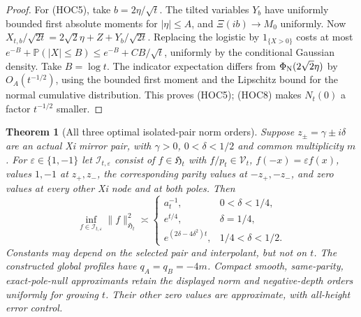 \documentclass[11pt]{article}
\newtheorem{theorem}{Theorem}
\theoremstyle{remark}\newtheorem{remark}[theorem]{Remark}
\begin{document}
\begin{proof}
For (HOC5), take $b=2\eta/\sqrt t$. The tilted variables $Y_b$
have uniformly bounded first absolute moments for $|\eta|\le A$,
and $\Xi(ib)\to M_0$ uniformly. Now
$X_{t,b}/\sqrt{2t}=2\sqrt2\eta+Z+Y_b/\sqrt{2t}$.
Replacing the logistic by $1_{\{X>0\}}$ costs at most
$e^{-B}+\mathbb P(|X|\le B)\le e^{-B}+CB/\sqrt t$,
uniformly by the conditional Gaussian density. Take $B=\log t$.
The indicator expectation differs from $\Phi_{\rm N}(2\sqrt2\eta)$
by $O_A(t^{-1/2})$, using the bounded first moment and the
Lipschitz bound for the normal cumulative distribution.
This proves (HOC5); (HOC8) makes $N_t(0)$ a factor $t^{-1/2}$ smaller.
\end{proof}

\begin{theorem}[All three optimal isolated-pair norm orders]
\label{thm:optimal-isolated-heat-orders}
Suppose $z_\pm=\gamma\pm i\delta$ are an actual Xi mirror pair,
with $\gamma>0$, $0<\delta<1/2$ and common multiplicity $m$.
For $\varepsilon\in\{1,-1\}$ let $\mathcal I_{t,\varepsilon}$
consist of $f\in\mathfrak H_t$ with $f/p_t\in\mathcal V_t$,
$f(-x)=\varepsilon f(x)$, values $1,-1$ at $z_+,z_-$,
the corresponding parity values at $-z_+,-z_-$, and zero values
at every other Xi node and at both poles. Then
\[
 \inf_{f\in\mathcal I_{t,\varepsilon}}\|f\|_{\mathfrak H_t}^2
 \asymp
 \begin{cases}
  a_t^{-1},&0<\delta<1/4,\\
  e^{t/4},&\delta=1/4,\\
  e^{(2\delta-4\delta^2)t},&1/4<\delta<1/2.
 \end{cases}                                                \tag{HIO1}
\]
Constants may depend on the selected pair and interpolant, but not
on $t$. The constructed global profiles have $q_A=q_B=-4m$.
Compact smooth, same-parity, exact-pole-null approximants retain
the displayed norm and negative-depth orders uniformly for growing $t$.
Their other zero values are approximate, with all-height error control.
\end{theorem}
\end{document}
